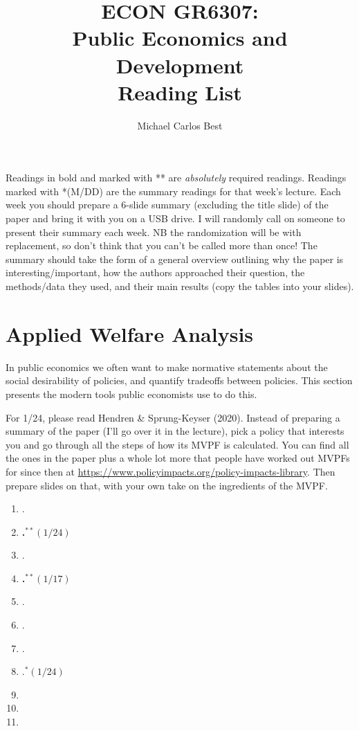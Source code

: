 \documentclass[11pt]{article}
\begin{document}
\title{ECON GR6307: \\ Public Economics and Development \\ Reading List}
\author{Michael Carlos Best}

\maketitle

Readings in bold and marked with ** are \textit{absolutely} required readings. Readings marked with *(M/DD) are the summary readings for that week's lecture. Each week you should prepare a 6-slide summary (excluding the title slide) of the paper and bring it with you on a USB drive. I will randomly call on someone to present their summary each week. NB the randomization will be with replacement, so don't think that you can't be called more than once! The summary should take the form of a general overview outlining why the paper is interesting/important, how the authors approached their question, the methods/data they used, and their main results (copy the tables into your slides).

\section{Applied Welfare Analysis}

In public economics we often want to make normative statements about the social desirability of policies, and quantify tradeoffs between policies. This section presents the modern tools public economists use to do this. 

For 1/24, please read Hendren \& Sprung-Keyser (2020). Instead of preparing a summary of the paper (I'll go over it in the lecture), pick a policy that interests you and go through all the steps of how its MVPF is calculated. You can find all the ones in the paper plus a whole lot more that people have worked out MVPFs for since then at \url{https://www.policyimpacts.org/policy-impacts-library}. Then prepare slides on that, with your own take on the ingredients of the MVPF.

\begin{enumerate}
\item {}.
\item \textbf{.$^{**}(1/24)$}
\item {}.
\item \textbf{.$^{**}(1/17)$}
\item {}.
\item {}.
\item {}.
\item {}.$^{*}(1/24)$
\item {}
\item {}
\item {}
\end{enumerate}
\end{document}
